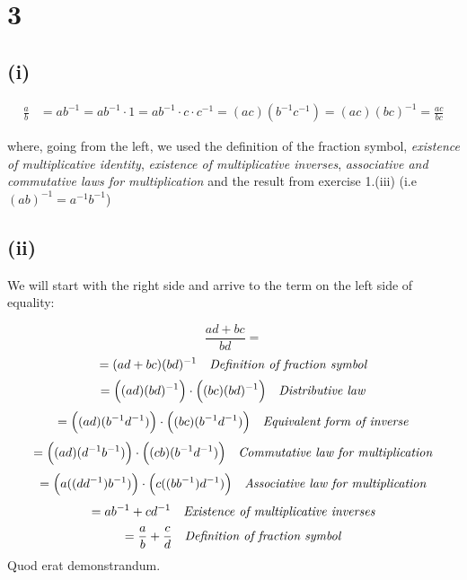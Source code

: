 \documentclass{article}
\begin{document}
\section*{3}

\subsection*{(i)}

\begin{align*}
	\frac{a}{b} &= ab^{-1} = ab^{-1} \cdot 1 = ab^{-1} \cdot c \cdot c^{-1} = (ac)(b^{-1}c^{-1}) = (ac)(bc)^{-1} = \frac{ac}{bc}
\end{align*}

where, going from the left, we used the definition of the fraction symbol, \emph{existence of multiplicative identity},
\emph{existence of multiplicative inverses}, \emph{associative and commutative laws for multiplication} and 
the result from exercise 1.(iii) (i.e \((ab)^{-1} = a^{-1}b^{-1}\))

\subsection*{(ii)}

We will start with the right side and arrive to the term on the left side of equality:

\begin{equation*}
	\frac{ad + bc}{bd} =
\end{equation*}
\begin{equation*}
	= (ad + bc)(bd)^{-1} \ \ \ \emph{Definition of fraction symbol}
\end{equation*}
\begin{equation*}
	= \Big((ad)(bd)^{-1}\Big) \cdot \Big((bc)(bd)^{-1}\Big) \ \ \ \mbox{\emph{Distributive law}}
\end{equation*}
\begin{equation*}
	= \Big((ad)(b^{-1}d^{-1})\Big) \cdot \Big((bc)(b^{-1}d^{-1})\Big) \ \ \ \mbox{\emph{Equivalent form of inverse}}
\end{equation*}
\begin{equation*}
	= \Big((ad)(d^{-1}b^{-1})\Big) \cdot \Big((cb)(b^{-1}d^{-1})\Big) \ \ \ \mbox{\emph{Commutative law for multiplication}}
\end{equation*}
\begin{equation*}
	= \Big(a((dd^{-1})b^{-1})\Big) \cdot \Big(c((bb^{-1})d^{-1})\Big) \ \ \ \mbox{\emph{Associative law for multiplication}}
\end{equation*}
\begin{equation*}
	= ab^{-1} + cd^{-1} \ \ \ \mbox{\emph{Existence of multiplicative inverses}}
\end{equation*}
\begin{equation*}
	= \frac{a}{b} + \frac{c}{d} \ \ \ \mbox{\emph{Definition of fraction symbol}}
\end{equation*}
Quod erat demonstrandum.
\end{document}
